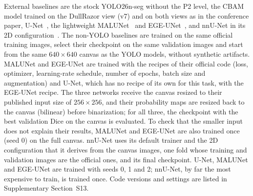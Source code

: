External baselines are the stock YOLO26n-seg without the P2 level, the CBAM model trained on the DullRazor view (v7) and on both views as in the conference paper, U-Net~\cite{ronneberger2015unet}, the lightweight MALUNet~\cite{ruan2022malunet} and EGE-UNet~\cite{ruan2023egeunet}, and nnU-Net in its 2D configuration~\cite{isensee2021nnunet}.  The non-YOLO baselines are trained on the same official training images, select their checkpoint on the same validation images and start from the same $640\times640$ canvas as the YOLO models, without synthetic artifacts. MALUNet and EGE-UNet are trained with the recipes of their official code (loss, optimizer, learning-rate schedule, number of epochs, batch size and augmentation) and U-Net, which has no recipe of its own for this task, with the EGE-UNet recipe. The three networks receive the canvas resized to their published input size of $256\times256$, and their probability maps are resized back to the canvas (bilinear) before binarization; for all three, the checkpoint with the best validation Dice on the canvas is evaluated. To check that the smaller input does not explain their results, MALUNet and EGE-UNet are also trained once (seed 0) on the full canvas. nnU-Net uses its default trainer and the 2D configuration that it derives from the canvas images, one fold whose training and validation images are the official ones, and its final checkpoint. U-Net, MALUNet and EGE-UNet are trained with seeds 0, 1 and 2; nnU-Net, by far the most expensive to train, is trained once. Code versions and settings are listed in Supplementary Section~S13.


